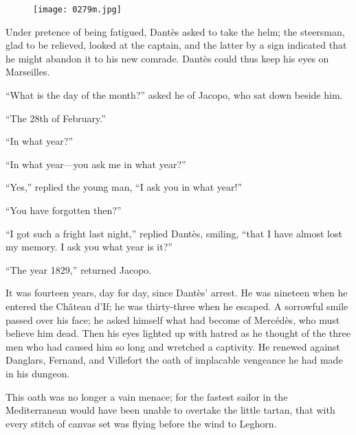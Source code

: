 \begin{figure}[ht]
\texttt{[image: 0279m.jpg]}
\end{figure}

Under pretence of being fatigued, Dantès asked to take the helm; the
steersman, glad to be relieved, looked at the captain, and the latter
by a sign indicated that he might abandon it to his new comrade. Dantès
could thus keep his eyes on Marseilles.

“What is the day of the month?” asked he of Jacopo, who sat down beside
him.

“The 28th of February.”

“In what year?”

“In what year—you ask me in what year?”

“Yes,” replied the young man, “I ask you in what year!”

“You have forgotten then?”

“I got such a fright last night,” replied Dantès, smiling, “that I have
almost lost my memory. I ask you what year is it?”

“The year 1829,” returned Jacopo.

It was fourteen years, day for day, since Dantès’ arrest. He was
nineteen when he entered the Château d’If; he was thirty-three when he
escaped. A sorrowful smile passed over his face; he asked himself what
had become of Mercédès, who must believe him dead. Then his eyes
lighted up with hatred as he thought of the three men who had caused
him so long and wretched a captivity. He renewed against Danglars,
Fernand, and Villefort the oath of implacable vengeance he had made in
his dungeon.

This oath was no longer a vain menace; for the fastest sailor in the
Mediterranean would have been unable to overtake the little tartan,
that with every stitch of canvas set was flying before the wind to
Leghorn.

